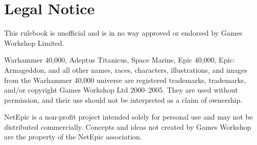\section{Legal Notice}

This rulebook is unofficial and is in no way approved or endorsed by Games Workshop Limited.

Warhammer 40,000, Adeptus Titanicus, Space Marine, Epic 40,000, Epic: Armageddon, and all other names, races, characters, illustrations, and images from the Warhammer 40,000 universe are registered trademarks, trademarks, and/or copyright Games Workshop Ltd 2000--2005. They are used without permission, and their use should not be interpreted as a claim of ownership.

NetEpic is a non-profit project intended solely for personal use and may not be distributed commercially. Concepts and ideas not created by Games Workshop are the property of the NetEpic association.
